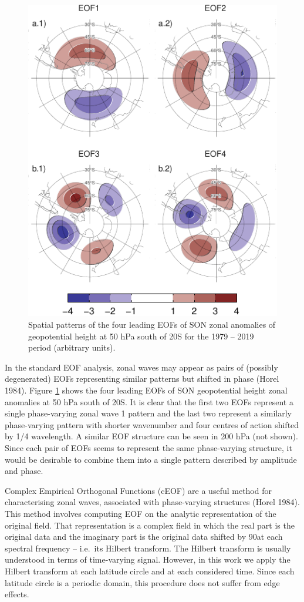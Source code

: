 \documentclass[smallextended]{svjour3}       %
\begin{document}
\begin{figure}
\centering
\includegraphics{../figures/eof-naive-1.pdf}
\caption{\label{fig:eof-naive}Spatial patterns of the four leading EOFs of SON zonal anomalies of geopotential height at 50 hPa south of 20\degree S for the 1979 -- 2019 period (arbitrary units).}
\end{figure}

In the standard EOF analysis, zonal waves may appear as pairs of (possibly degenerated) EOFs representing similar patterns but shifted in phase (Horel 1984).
Figure \ref{fig:eof-naive} shows the four leading EOFs of SON geopotential height zonal anomalies at 50 hPa south of 20\degree S.
It is clear that the first two EOFs represent a single phase-varying zonal wave 1 pattern and the last two represent a similarly phase-varying pattern with shorter wavenumber and four centres of action shifted by 1/4 wavelength.
A similar EOF structure can be seen in 200 hPa (not shown).
Since each pair of EOFs seems to represent the same phase-varying structure, it would be desirable to combine them into a single pattern described by amplitude and phase.

Complex Empirical Orthogonal Functions (cEOF) are a useful method for characterising zonal waves, associated with phase-varying structures (Horel 1984).
This method involves computing EOF on the analytic representation of the original field.
That representation is a complex field in which the real part is the original data and the imaginary part is the original data shifted by 90\degree at each spectral frequency -- i.e.~its Hilbert transform.
The Hilbert transform is usually understood in terms of time-varying signal.
However, in this work we apply the Hilbert transform at each latitude circle and at each considered time.
Since each latitude circle is a periodic domain, this procedure does not suffer from edge effects.
\end{document}
